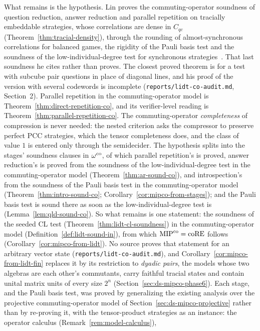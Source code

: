 \begin{remark}
What remains is the hypothesis. Lin proves the commuting-operator soundness of question
reduction, answer reduction and parallel repetition on tracially embeddable strategies, whose
correlations are dense in $C_{qc}$ (Theorem~\ref{thm:tracial-density}), through the rounding
of almost-synchronous correlations for balanced games, the rigidity of the Pauli basis test
and the soundness of the low-individual-degree test for synchronous strategies~\cite{Lin23,Lin25}.
That last soundness he cites rather than proves. The closest proved theorem is for a test with
subcube pair questions in place of diagonal lines, and his proof of the version with several
codewords is incomplete (\texttt{reports/lidt-co-audit.md}, Section~2). Parallel repetition in
the commuting-operator model is
Theorem~\ref{thm:direct-repetition-co}, and its verifier-level reading is
Theorem~\ref{thm:parallel-repetition-co}. The commuting-operator
\emph{completeness} of compression is never needed: the nested criterion asks the
compressor to preserve perfect PCC strategies, which the tensor completeness does, and the
class of value $1$ is entered only through the semidecider. The hypothesis splits into the
stages' soundness clauses in $\omega^{\mathrm{co}}$, of which parallel repetition's is proved, answer
reduction's is proved from the soundness of the low-individual-degree test in the
commuting-operator model (Theorem~\ref{thm:ar-sound-co}), and introspection's from the soundness
of the Pauli basis test in the commuting-operator model (Theorem~\ref{thm:intro-sound-co};
Corollary~\ref{cor:mipco-from-stages}); and the Pauli basis test is sound there as soon as the
low-individual-degree test is (Lemma~\ref{lem:qld-sound-co}). So what remains is one statement:
the soundness of the seeded CL test (Theorem~\ref{thm:lidt-cl-soundness}) in the
commuting-operator model (Definition~\ref{def:lidt-sound-in}), from which $\mathrm{MIP}^{\mathrm{co}} = \mathrm{coRE}$ follows
(Corollary~\ref{cor:mipco-from-lidt}). No source proves that statement for an arbitrary vector
state (\texttt{reports/lidt-co-audit.md}), and Corollary~\ref{cor:mipco-from-lidt-fin} replaces it
by its restriction to \emph{dyadic pairs}, the models whose two algebras are each other's
commutants, carry faithful tracial states and contain unital matrix units of every size $2^n$
(Section~\ref{sec:ds-mipco-phase6}). Each stage, and the Pauli basis test, was proved by
generalizing the existing analysis over the projective commuting-operator model of
Section~\ref{sec:ds-mipco-projective} rather than by re-proving it, with the tensor-product
strategies as an instance: the operator calculus (Remark~\ref{rem:model-calculus}),

\end{remark}
